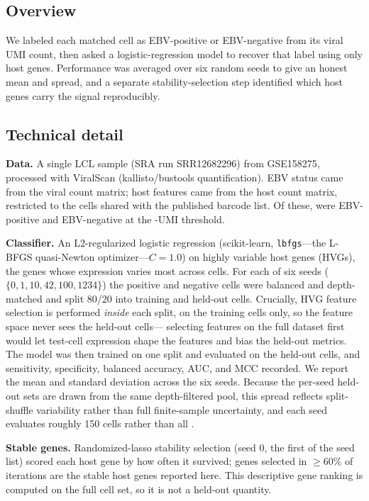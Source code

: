 \documentclass[11pt]{article}
\begin{document}
\subsection{Overview}
We labeled each matched cell as EBV-positive or EBV-negative from its viral UMI
count, then asked a logistic-regression model to recover that label using only
host genes. Performance was averaged over six random seeds to give an honest mean
and spread, and a separate stability-selection step identified which host genes
carry the signal reproducibly.

\subsection{Technical detail}
\textbf{Data.} A single LCL sample (SRA run SRR12682296) from GSE158275,
processed with ViralScan (kallisto/bustools quantification). EBV status came from
the viral count matrix; host features came from the host count matrix, restricted
to the  cells shared with the published barcode list.
Of these,  were EBV-positive and
 EBV-negative at the
-UMI threshold.

\textbf{Classifier.} An L2-regularized logistic regression (scikit-learn,
\texttt{lbfgs}---the L-BFGS quasi-Newton optimizer---$C=1.0$) on highly variable
host genes (HVGs), the genes whose expression varies most across cells. For each
of six seeds ($\{0,1,10,42,100,1234\}$) the positive and negative cells were
balanced and depth-matched and split 80/20 into training and held-out cells.
Crucially, HVG feature selection is performed \emph{inside} each split, on the
training cells only, so the feature space never sees the held-out cells---
selecting features on the full dataset first would let test-cell expression shape
the features and bias the held-out metrics. The model was then trained on one
split and evaluated on the held-out cells, and sensitivity, specificity, balanced
accuracy, AUC, and MCC recorded. We report the mean and standard deviation across
the six seeds. Because the per-seed held-out sets are drawn from the same
depth-filtered pool, this spread reflects split-shuffle variability rather than
full finite-sample uncertainty, and each seed evaluates roughly 150 cells rather
than all .

\textbf{Stable genes.} Randomized-lasso stability selection (seed 0, the first of
the seed list) scored each host gene by how often it survived; genes selected in
$\geq$60\% of iterations are the  stable host genes
reported here. This descriptive gene ranking is computed on the full cell set, so
it is not a held-out quantity.
\end{document}

